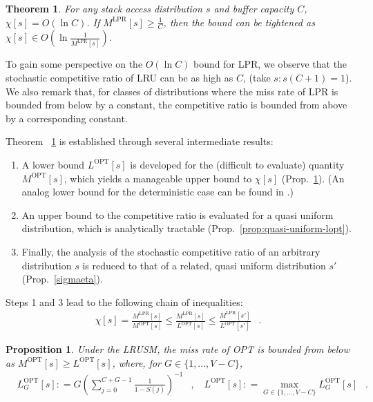 \documentclass[11pt,a4paper]{article}
\DeclareMathOperator{\opt}{OPT}
\DeclareMathOperator{\lpr}{LPR}
\DeclareMathOperator{\mf}{\enspace .}
\DeclareMathOperator{\mc}{\enspace ,}
\newcommand{\deq}{\mathrel{\mathop:}=}
\newtheorem{theorem}{Theorem}
\newtheorem{proposition}{Proposition}
\theoremstyle{definition}
\theoremstyle{remark}
\begin{document}
\begin{theorem}\label{thm:compet}
  For any stack access distribution $s$ and buffer capacity $C$, $\chi[s]
  =O (\ln C)$.  If $M^{\lpr}[s] \geq \frac{1}{C}$, then the bound can be
    tightened as $\chi[s] \in O\left(\ln\frac{1}{M^{\lpr}[s]}\right)
  $.
\end{theorem}

To gain some perspective on the $O(\ln C)$ bound for LPR, we observe
that the stochastic competitive ratio of LRU can be as high as $C$,
(take $s : s(C+1)=1 $). We also remark that, for classes of
distributions where the miss rate of LPR is bounded from below by a
constant, the competitive ratio is bounded from above by a
corresponding constant.

Theorem ~\ref{thm:compet} is established through several intermediate
results:
\begin{enumerate}
\item A lower bound $L^{\opt}[s]$ is developed for the (difficult
  to evaluate) quantity $M^{\opt}[s]$, which yields a manageable upper
  bound to $\chi[s]$ (Prop.~\ref{bellb}). (An analog lower bound for
  the deterministic case can be found in \cite{PanagiotouS06}.)
\item An upper bound to the competitive ratio is evaluated for a quasi
  uniform distribution, which is analytically tractable
  (Prop.~\ref{prop:quasi-uniform-lopt}).
\item Finally, the analysis of the stochastic competitive ratio of an arbitrary
  distribution $s$ is reduced to that of a related, quasi uniform distribution
  $s'$ (Prop.~\ref{sigmaeta}).
\end{enumerate}
Steps 1 and 3 lead to the following chain of inequalities:
\begin{align}
  \chi[s]=\frac{M^{\lpr}[s]}{M^{\opt}[s]} \leq \frac{M^{\lpr}[s]}{L^{\opt}[s]}
  \leq \frac{M^{\lpr}[s']}{L^{\opt}[s']} \mf
\end{align}


\begin{proposition}\label{bellb}
  Under the LRUSM, the miss rate of OPT is bounded from below as $ M^{\opt}[s]
  \geq L^{\opt}[s]$, where, for $G\in\{1,\ldots,V-C\}$,
  \begin{align}\label{eq:lopt}
    &L^{\opt}_G[s]\deq G\left(\sum_{j=0}^{C+G-1} \frac{1}{1-S(j)}\right)^{-1}
    \mc &L^{\opt}[s] \deq \max_{G\in\{1,\ldots,V-C\}} L^{\opt}_G[s] \mf
  \end{align}
\end{proposition}
\end{document}
